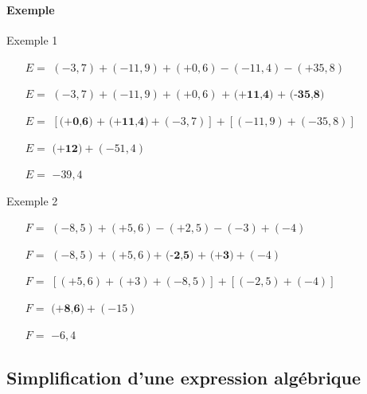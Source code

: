 \documentclass{beamer}
\begin{document}
\begin{frame}[allowframebreaks]
	\frametitle{} %
	\framesubtitle{Exemple }	
	
	
	\begin{exampleblock}{Exemple 1}
		\begin{itemize}
			\item[$E=$] $(-3,7) + (-11,9) + (+0,6) - (-11,4) - (+35,8)$
			\item[$E=$] $(-3,7) + (-11,9) + (+0,6)\textbf{ + (+11,4) + (-35,8)}$
			\item[$E=$] $ [\textbf{(+0,6) + (+11,4)} + (-3,7) ] + [(-11,9) + (-35,8)]$
			\item[$E=$] $\textbf{(+12)} + (-51,4)$
			\item[$E=$] $ -39,4 $
		\end{itemize}		
	\end{exampleblock}
	
	\begin{exampleblock}{Exemple 2}
		\begin{itemize}
			\item[$F=$] $(-8,5) + (+5,6) - (+2,5) - (-3) + (-4)$
			\item[$F=$] $(-8,5) + (+5,6) \textbf{+ (-2,5) + (+3)} + (-4)$
			\item[$F=$] $ [(+5,6) + (+3) + (-8,5)] + [(-2,5) + (-4)]$
			\item[$F=$] $\textbf{(+8,6)} + (-15)$
			\item[$F=$] $ -6,4 $
		\end{itemize}		
	\end{exampleblock}
\end{frame}
	
\subsection{Simplification d'une expression algébrique}
\end{document}
